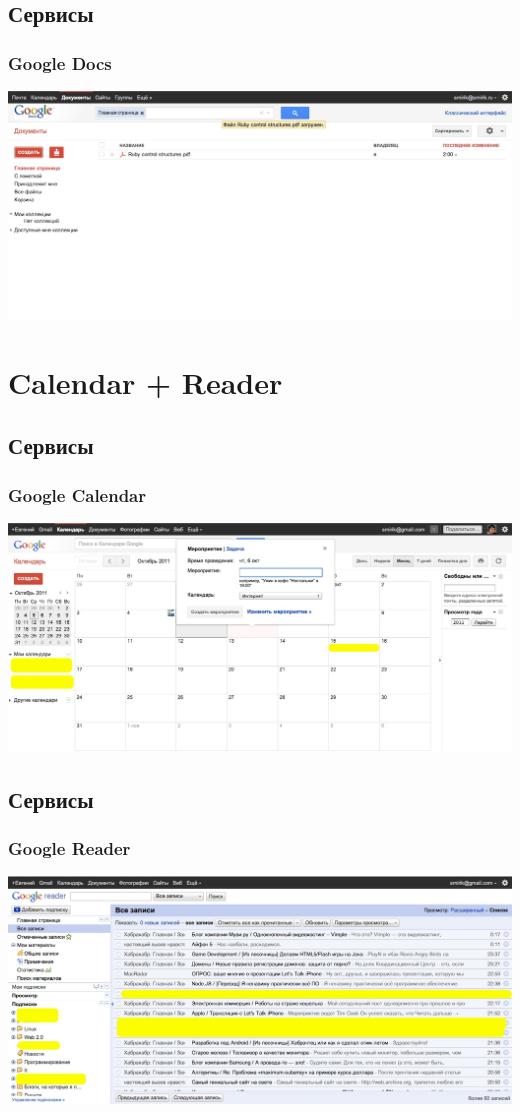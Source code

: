 \documentclass[compress,red]{beamer}
\begin{document}
\subsection{Сервисы}
\begin{frame}
  \frametitle{Google Docs}
	\centerline{\includegraphics[width=1.0\textwidth]{images/gdocs1.jpg}}
\end{frame}

\section{Calendar + Reader}
\subsection{Сервисы}
\begin{frame}
  \frametitle{Google Calendar}
	\centerline{\includegraphics[width=1.0\textwidth]{images/calendar.jpg}}
\end{frame}

\subsection{Сервисы}
\begin{frame}
  \frametitle{Google Reader}
	\centerline{\includegraphics[width=1.0\textwidth]{images/reader.jpg}}
\end{frame}
\end{document}
